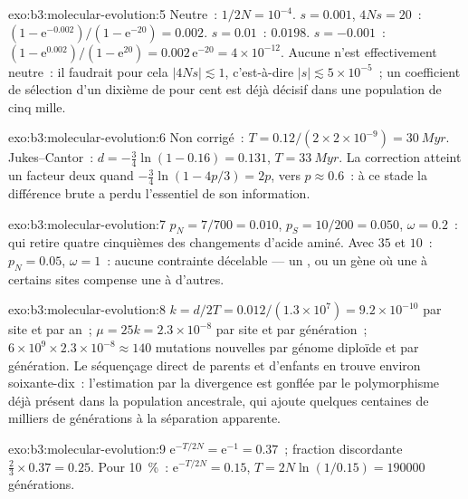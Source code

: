 \begin{solution}{exo:b3:molecular-evolution:5}
Neutre~: $1/2N = 10^{-4}$. $s = 0.001$, $4Ns = 20$~: $(1 - \mathrm{e}^{-0.002})/
(1 - \mathrm{e}^{-20}) = 0.002$. $s = 0.01$~: $0.0198$. $s = -0.001$~: $(1 -
\mathrm{e}^{0.002})/(1 - \mathrm{e}^{20}) = 0.002\,\mathrm{e}^{-20} =
4\times 10^{-12}$. Aucune n'est effectivement neutre~: il faudrait pour
cela $|4Ns|
\lesssim 1$, c'est-à-dire $|s| \lesssim 5\times 10^{-5}$~; un coefficient
de sélection d'un dixième de pour cent est déjà décisif dans une
population de cinq mille.
\end{solution}

\begin{solution}{exo:b3:molecular-evolution:6}
Non corrigé~: $T = 0.12/(2\times 2\times 10^{-9}) = \qty{30}{Myr}$.
Jukes--Cantor~: $d = -\tfrac{3}{4}\ln(1 - 0.16) = 0.131$, $T =
\qty{33}{Myr}$. La correction atteint un facteur deux quand $-\tfrac{3}{4}
\ln(1 - 4p/3) = 2p$, vers $p \approx 0.6$~: à ce stade la différence
brute a perdu l'essentiel de son information.
\end{solution}

\begin{solution}{exo:b3:molecular-evolution:7}
$p_{N} = 7/700 = 0.010$, $p_{S} = 10/200 = 0.050$, $\omega = 0.2$~:
 qui retire quatre cinquièmes des changements
d'acide aminé. Avec $35$ et $10$~: $p_{N} = 0.05$, $\omega = 1$~: aucune
contrainte décelable --- un , ou un gène où une  à certains sites compense une  à
d'autres.
\end{solution}

\begin{solution}{exo:b3:molecular-evolution:8}
$k = d/2T = 0.012/(1.3\times 10^{7}) = 9.2\times 10^{-10}$ par site et
par an~; $\mu = 25k = 2.3\times 10^{-8}$ par site et par génération~;
$6\times
10^{9}\times 2.3\times 10^{-8} \approx 140$ mutations nouvelles par
génome diploïde et par génération. Le séquençage direct de parents et
d'enfants en trouve environ soixante-dix~: l'estimation par la
divergence est gonflée par le polymorphisme déjà présent dans la
population ancestrale, qui ajoute quelques centaines de milliers de
générations à la séparation apparente.
\end{solution}

\begin{solution}{exo:b3:molecular-evolution:9}
$\mathrm{e}^{-T/2N} = \mathrm{e}^{-1} = 0.37$~; fraction discordante $\tfrac{2}{3}
\times 0.37 = 0.25$. Pour \qty{10}{\%}~: $\mathrm{e}^{-T/2N} = 0.15$, $T =
2N\ln(1/0.15) = \num{190000}$ générations.
\end{solution}

